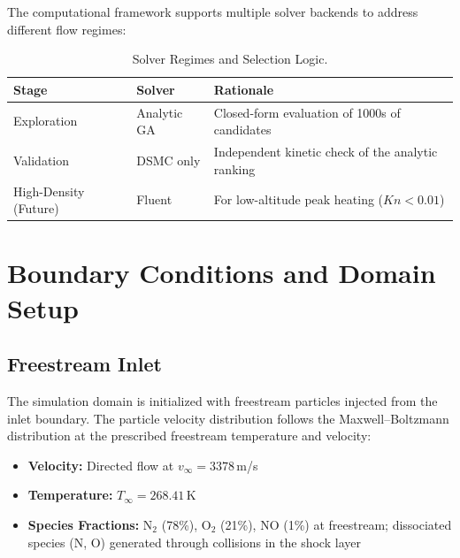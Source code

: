 The computational framework supports multiple solver backends to address different flow regimes:

\begin{table}[H]
    \centering
    \caption{Solver Regimes and Selection Logic.}
    \label{tab:solver_regimes}
    \begin{tabularx}{\textwidth}{|l|>{\RaggedRight\arraybackslash}p{}|>{\RaggedRight\arraybackslash}X|}
        \hline
        \textbf{Stage} & \textbf{Solver} & \textbf{Rationale} \\ \hline
        Exploration & Analytic GA & Closed-form evaluation of 1000s of candidates \\ \hline
        Validation & DSMC only & Independent kinetic check of the analytic ranking \\ \hline
        High-Density (Future) & Fluent & For low-altitude peak heating ($Kn < 0.01$) \\ \hline
    \end{tabularx}
\end{table}

\section{Boundary Conditions and Domain Setup}

\subsection{Freestream Inlet}
The simulation domain is initialized with freestream particles injected from the inlet boundary. The particle velocity distribution follows the Maxwell--Boltzmann distribution at the prescribed freestream temperature and velocity:

\begin{itemize}
    \item \textbf{Velocity:} Directed flow at $v_{\infty} = 3378$\,m/s
    \item \textbf{Temperature:} $T_{\infty} = 268.41$\,K
    \item \textbf{Species Fractions:} N$_2$ (78\%), O$_2$ (21\%), NO (1\%) at freestream; dissociated species (N, O) generated through collisions in the shock layer
\end{itemize}

